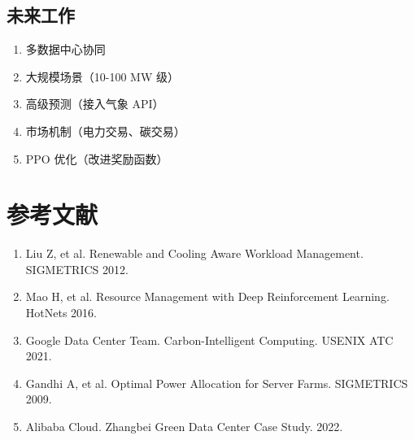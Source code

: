 \documentclass[12pt,a4paper]{article}
\begin{document}
\subsection{未来工作}

\begin{enumerate}
    \item 多数据中心协同
    \item 大规模场景（10-100 MW 级）
    \item 高级预测（接入气象 API）
    \item 市场机制（电力交易、碳交易）
    \item PPO 优化（改进奖励函数）
\end{enumerate}

\section*{参考文献}

\begin{enumerate}
    \item Liu Z, et al. Renewable and Cooling Aware Workload Management. SIGMETRICS 2012.
    \item Mao H, et al. Resource Management with Deep Reinforcement Learning. HotNets 2016.
    \item Google Data Center Team. Carbon-Intelligent Computing. USENIX ATC 2021.
    \item Gandhi A, et al. Optimal Power Allocation for Server Farms. SIGMETRICS 2009.
    \item Alibaba Cloud. Zhangbei Green Data Center Case Study. 2022.
\end{enumerate}
\end{document}
